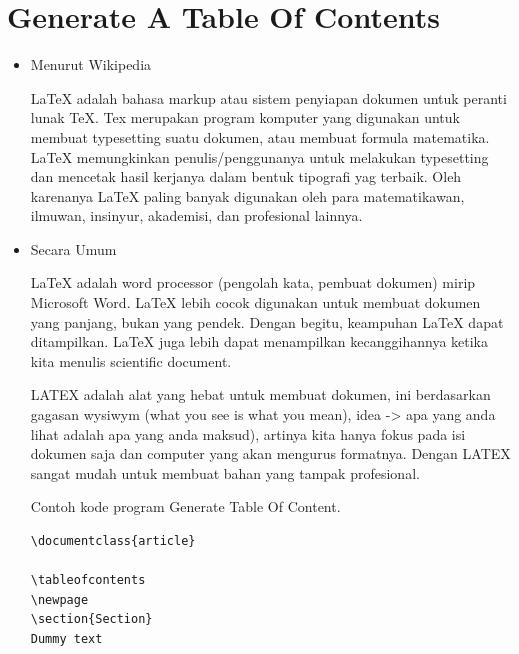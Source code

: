 
 \section{Generate A Table Of Contents}
\begin{itemize}
	\item Menurut Wikipedia \par

LaTeX adalah bahasa markup atau sistem penyiapan dokumen untuk peranti lunak TeX. Tex merupakan program komputer yang digunakan untuk membuat typesetting suatu dokumen, atau membuat formula matematika. LaTeX memungkinkan penulis/penggunanya untuk melakukan typesetting dan mencetak hasil kerjanya dalam bentuk tipografi yag terbaik. Oleh karenanya LaTeX paling banyak digunakan oleh para matematikawan, ilmuwan, insinyur, akademisi, dan profesional lainnya.\par

\vspace{\baselineskip}
	\item Secara Umum\par

LaTeX adalah word processor (pengolah kata, pembuat dokumen) mirip Microsoft Word. LaTeX lebih cocok digunakan untuk membuat dokumen yang panjang, bukan yang pendek. Dengan begitu, keampuhan LaTeX dapat ditampilkan. LaTeX juga lebih dapat menampilkan kecanggihannya ketika kita menulis scientific document.\par
\vspace{\baselineskip}

LATEX adalah alat yang hebat untuk membuat dokumen, ini berdasarkan gagasan wysiwym (what you see is what you mean), idea -> apa yang anda lihat adalah apa yang anda maksud), artinya kita hanya fokus pada isi dokumen saja dan computer yang akan mengurus formatnya. Dengan LATEX sangat mudah untuk membuat bahan yang tampak profesional.\par

\vspace{\baselineskip}

Contoh kode program Generate Table Of Content.\par

\begin{verbatim}
\documentclass{article}

\tableofcontents
\newpage
\section{Section}
Dummy text

\end{verbatim}
\end{itemize}
